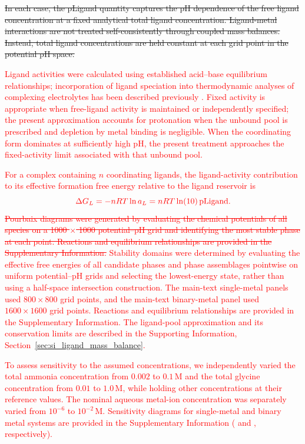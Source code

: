 \documentclass[twoside,twocolumn,9pt]{article}
\begin{document}
\sout{In each case, the pLigand quantity captures the pH dependence of the free ligand concentration at a fixed analytical total ligand concentration. Ligand-metal interactions are not treated self-consistently through coupled mass balances. Instead, total ligand concentrations are held constant at each grid point in the potential pH space.}

\textcolor{red}{Ligand activities were calculated using established acid--base equilibrium relationships; incorporation of ligand speciation into thermodynamic analyses of complexing electrolytes has been described previously \cite{Smith1989CriticalConstants,Murase1999Potential-pHBaths,Puente-Siller2013ASolutions}. Fixed activity is appropriate when free-ligand activity is maintained or independently specified; the present approximation accounts for protonation when the unbound pool is prescribed and depletion by metal binding is negligible. When the coordinating form dominates at sufficiently high pH, the present treatment approaches the fixed-activity limit associated with that unbound pool.}

\textcolor{red}{For a complex containing $n$ coordinating ligands, the ligand-activity contribution to its effective formation free energy relative to the ligand reservoir is}
\begin{equation}\label{eq:ligand_activity_free_energy}
    \textcolor{red}{\Delta G_L=-nRT\ln a_L=nRT\ln(10)\,\mathrm{pLigand}.}
\end{equation}
\textcolor{red}{\sout{Pourbaix diagrams were generated by evaluating the chemical potentials of all species on a 1000 $\times$ 1000 potential–pH grid and identifying the most stable phase at each point. Reactions and equilibrium relationships are provided in the Supplementary Information.}}
\textcolor{red}{Stability domains were determined by evaluating the effective free energies of all candidate phases and phase assemblages pointwise on uniform potential--pH grids and selecting the lowest-energy state, rather than using a half-space intersection construction. The main-text single-metal panels used $800\times800$ grid points, and the main-text binary-metal panel used $1600\times1600$ grid points. Reactions and equilibrium relationships are provided in the Supplementary Information. The ligand-pool approximation and its conservation limits are described in the Supporting Information, Section~\ref{sec:si_ligand_mass_balance}.}

\textcolor{red}{To assess sensitivity to the assumed concentrations, we independently varied the total ammonia concentration from $0.002$ to $0.1\,\mathrm{M}$ and the total glycine concentration from $0.01$ to $1.0\,\mathrm{M}$, while holding other concentrations at their reference values. The nominal aqueous metal-ion concentration was separately varied from $10^{-6}$ to $10^{-2}\,\mathrm{M}$. Sensitivity diagrams for single-metal and binary metal systems are provided in the Supplementary Information ( and , respectively).}
\end{document}
